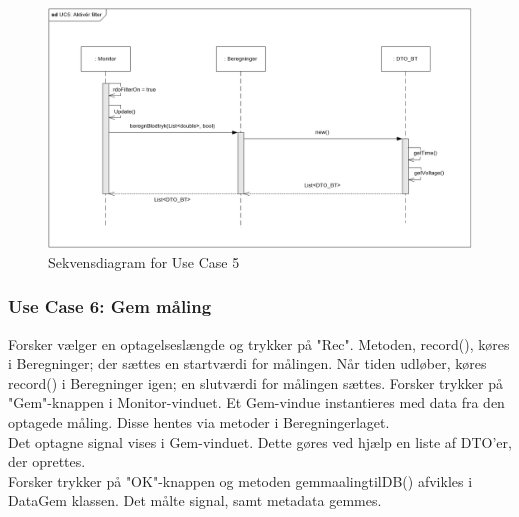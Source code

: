 \begin{figure}[H]
	\centering
	\includegraphics[width=1\textwidth]{Figurer/UC5_SD_SW}
	\caption{Sekvensdiagram for Use Case 5}
\end{figure}

\subsubsection{Use Case 6: Gem måling}
Forsker vælger en optagelseslængde og trykker på "Rec". Metoden, record(), køres i Beregninger; der sættes en startværdi for målingen.
Når tiden udløber, køres record() i Beregninger igen; en slutværdi for målingen sættes.
Forsker trykker på "Gem"\--knappen i Monitor-vinduet. Et Gem-vindue instantieres med data fra den optagede måling. Disse hentes via metoder i Beregningerlaget.\\
Det optagne signal vises i Gem-vinduet. Dette gøres ved hjælp en liste af DTO'er, der oprettes.\\

Forsker trykker på "OK"\--knappen
og metoden gemmaalingtilDB() afvikles i DataGem klassen. Det målte signal, samt metadata gemmes. 

